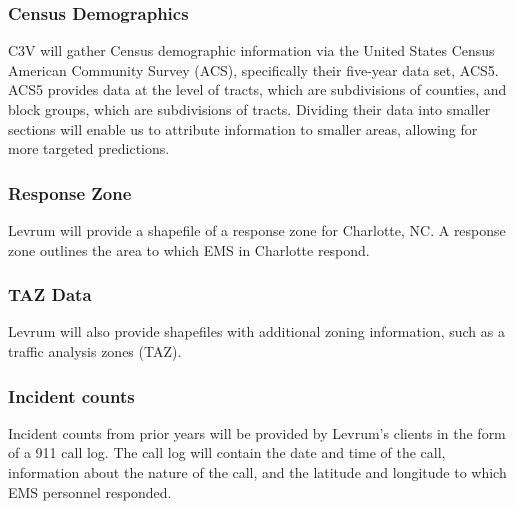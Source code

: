 \documentclass[onecolumn, draftclsnofoot,10pt, compsoc]{IEEEtran}
\begin{document}
\begin{singlespace}
        \subsubsection{Census Demographics}
        C3V will gather Census demographic information via the United States Census American Community Survey (ACS), specifically their five-year data set, ACS5. ACS5 provides data at the level of tracts, which are subdivisions of counties, and block groups, which are subdivisions of tracts. Dividing their data into smaller sections will enable us to attribute information to smaller areas, allowing for more targeted predictions.
        
        \subsubsection{Response Zone}
        Levrum will provide a shapefile of a response zone for Charlotte, NC. A response zone outlines the area to which EMS in Charlotte respond.
        
        \subsubsection{TAZ Data}
        Levrum will also provide shapefiles with additional zoning information, such as a traffic analysis zones (TAZ).
        
        \subsubsection{Incident counts}
        Incident counts from prior years will be provided by Levrum's clients in the form of a 911 call log. The call log will contain the date and time of the call, information about the nature of the call, and the latitude and longitude to which EMS personnel responded.
    

\end{singlespace}
\end{document}
